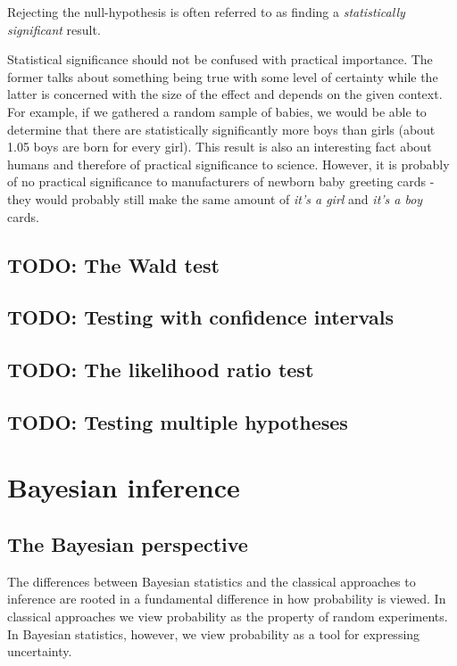 \documentclass{book}
\theoremstyle{plain}%
\theoremstyle{definition}
\begin{document}
Rejecting the null-hypothesis is often referred to as finding a \emph{statistically significant} result. 

Statistical significance should not be confused with practical importance. The former talks about something being true with some level of certainty while the latter is concerned with the size of the effect and depends on the given context. For example, if we gathered a random sample of babies, we would be able to determine that there are statistically significantly more boys than girls (about 1.05 boys are born for every girl). This result is also an interesting fact about humans and therefore of practical significance to science. However, it is probably of no practical significance to manufacturers of newborn baby greeting cards - they would probably still make the same amount of \emph{it's a girl} and \emph{it's a boy} cards.

\section{TODO: The Wald test}

\section{TODO: Testing with confidence intervals}

\section{TODO: The likelihood ratio test}

\section{TODO: Testing multiple hypotheses}


\chapter{Bayesian inference}\label{ch:bayes}

\section{The Bayesian perspective}

The differences between Bayesian statistics and the classical approaches to inference are rooted in a fundamental difference in how probability is viewed. In classical approaches we view probability as the property of random experiments. In Bayesian statistics, however, we view probability as a tool for expressing uncertainty. 
\end{document}
